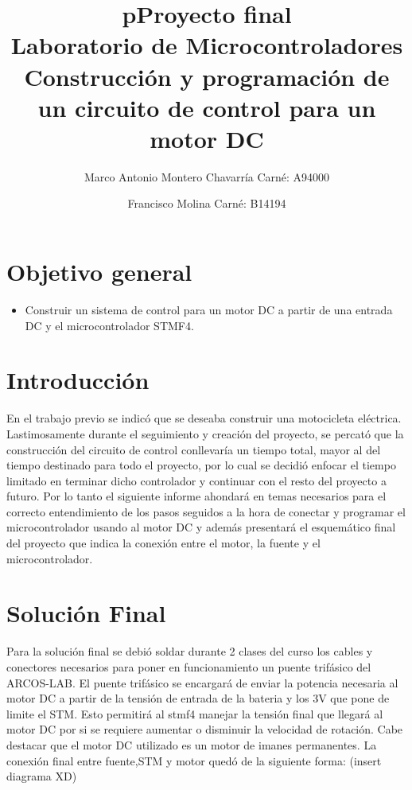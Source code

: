 \documentclass[letterpaper]{article}
\begin{document}
\title{pProyecto final\\ Laboratorio de Microcontroladores\\ Construcción y programación de un circuito de control para un motor DC}
\author{
 Marco Antonio Montero Chavarrí­a Carné: A94000\\
 \and
 Francisco Molina Carné: B14194}
\maketitle

\section{Objetivo general}
\begin{itemize}
\item Construir un sistema de control para un motor DC a partir de una entrada DC y el microcontrolador STMF4.
\end{itemize}

\section{Introducción}

En el trabajo previo se indicó que se deseaba construir una motocicleta eléctrica. Lastimosamente durante el seguimiento y creación del proyecto, se percató que la
construcción del circuito de control conllevaría un tiempo total, mayor al del tiempo destinado para todo el proyecto, por lo cual se decidió enfocar el tiempo limitado
en terminar dicho controlador y continuar con el resto del proyecto a futuro. 
Por lo tanto el siguiente informe ahondará en temas necesarios para el correcto entendimiento de los pasos seguidos 
a la hora de conectar y programar el microcontrolador usando al motor DC y además presentará el esquemático final del proyecto que indica la conexión entre 
el motor, la fuente y el microcontrolador.

\section{Solución Final}
Para la solución final se debió soldar durante 2 clases del curso los cables y conectores necesarios para poner en funcionamiento un puente trifásico del ARCOS-LAB. El puente
trifásico se encargará de enviar la potencia necesaria al motor DC a partir de la tensión de entrada de la bateria y los 3V que pone de limite el STM.
Esto permitirá al stmf4 manejar la tensión final que llegará al motor DC por si se requiere aumentar o disminuir la velocidad de rotación.
Cabe destacar que el motor DC utilizado es un motor de imanes permanentes. La conexión final entre fuente,STM y motor quedó de la siguiente forma:
 (insert diagrama XD)
 
\end{document}

